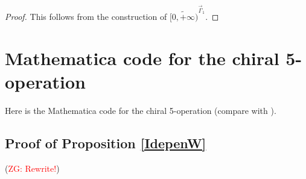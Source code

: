\documentclass[11pt]{amsart}
\theoremstyle{definition}
\theoremstyle{remark}
\numberwithin{equation}{section}
\newcommand{\Gui}[1]{(\textcolor{red}{ZG: #1})}
\begin{document}
\begin{proof}
  This follows from the construction of $\widetilde{[0,+\infty)}^{\vec{\Gamma}_{1}}$.
\end{proof}


\section{Mathematica code for the chiral 5-operation}\label{MathematicaCode}
Here is the Mathematica code for the chiral 5-operation (compare with \cite[Section 4.8 (4.67)]{budzik2023feynman}).
\iffalse
\subsection{Proof of Proposition \ref{IdepenW}}\label{ProofIdepenW}
\Gui{Rewrite!}
\end{document}
